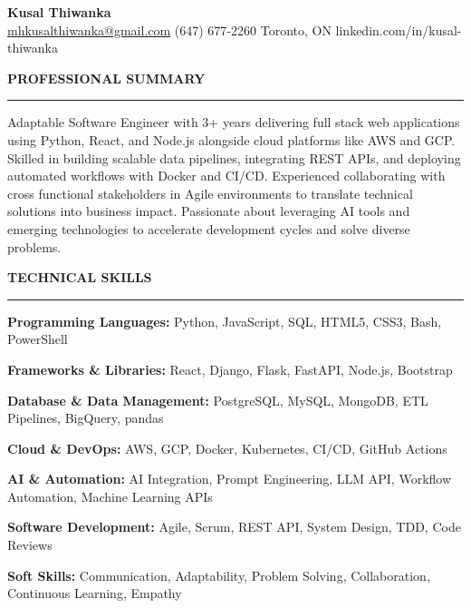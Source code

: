 \documentclass[10pt,letterpaper]{article}
\begin{document}
\begin{center}
{\LARGE\textbf{Kusal Thiwanka}}\\[3pt]
\href{mailto:mhkusalthiwanka@gmail.com}{mhkusalthiwanka@gmail.com}\hspace{2em}%
(647) 677{-}2260\hspace{2em}%
Toronto, ON\hspace{2em}
linkedin.com/in/kusal-thiwanka
\end{center}

\vspace{6pt}

\textbf{PROFESSIONAL SUMMARY}\\[-8pt]
\noindent\rule{\textwidth}{1pt}

\vspace{-2pt}

Adaptable Software Engineer with 3+ years delivering full stack web applications using Python, React, and Node.js alongside cloud platforms like AWS and GCP. Skilled in building scalable data pipelines, integrating REST APIs, and deploying automated workflows with Docker and CI/CD. Experienced collaborating with cross functional stakeholders in Agile environments to translate technical solutions into business impact. Passionate about leveraging AI tools and emerging technologies to accelerate development cycles and solve diverse problems.

\vspace{8pt}

\textbf{TECHNICAL SKILLS}\\[-8pt]
\noindent\rule{\textwidth}{1pt}

\vspace{-2pt}

\textbf{Programming Languages:} Python, JavaScript, SQL, HTML5, CSS3, Bash, PowerShell

\textbf{Frameworks \& Libraries:} React, Django, Flask, FastAPI, Node.js, Bootstrap

\textbf{Database \& Data Management:} PostgreSQL, MySQL, MongoDB, ETL Pipelines, BigQuery, pandas

\textbf{Cloud \& DevOps:} AWS, GCP, Docker, Kubernetes, CI/CD, GitHub Actions

\textbf{AI \& Automation:} AI Integration, Prompt Engineering, LLM API, Workflow Automation, Machine Learning APIs

\textbf{Software Development:} Agile, Scrum, REST API, System Design, TDD, Code Reviews

\textbf{Soft Skills:} Communication, Adaptability, Problem Solving, Collaboration, Continuous Learning, Empathy
\end{document}
